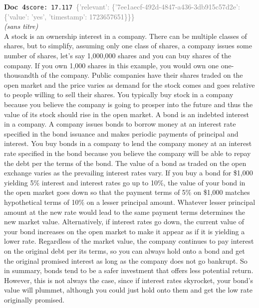\documentclass[a4paper,11pt]{article}
\begin{document}
\begin{docenv}
{\footnotesize\textcolor{doccolor}{\textbf{Doc~4}}}\hfill{\tiny\texttt{score:~17.117}}\ {\tiny\textcolor{gray}{\{'relevant': \{'7ee1aecf-492d-4847-a436-3db915c57d2e': \{'value': 'yes', 'timestamp': 1723657651\}\}\}}}\\[3pt]
{\small\textit{(sans titre)}}\\[2pt]
\vspace{2pt}
{\footnotesize 
A stock is an ownership interest in a company.  There can be multiple classes of shares, but to simplify, assuming only one class of shares, a company issues some number of shares, let's say 1,000,000 shares and you can buy shares of the company. If you own 1,000 shares in this example, you would own one one-thousandth of the company.  Public companies have their shares traded on the open market and the price varies as demand for the stock comes and goes relative to people willing to sell their shares. You typically buy stock in a company because you believe the company is going to prosper into the future and thus the value of its stock should rise in the open market. A bond is an indebted interest in a company.  A company issues bonds to borrow money at an interest rate specified in the bond issuance and makes periodic payments of principal and interest.  You buy bonds in a company to lend the company money at an interest rate specified in the bond because you believe the company will be able to repay the debt per the terms of the bond.  The value of a bond as traded on the open exchange varies as the prevailing interest rates vary.  If you buy a bond for \$1,000 yielding 5\% interest and interest rates go up to 10\%, the value of your bond in the open market goes down so that the payment terms of 5\% on \$1,000 matches hypothetical terms of 10\% on a lesser principal amount.  Whatever lesser principal amount at the new rate would lead to the same payment terms determines the new market value.   Alternatively, if interest rates go down, the current value of your bond increases on the open market to make it appear as if it is yielding a lower rate. Regardless of the market value, the company continues to pay interest on the original debt per its terms, so you can always hold onto a bond and get the original promised interest as long as the company does not go bankrupt. So in summary, bonds tend to be a safer investment that offers less potential return.  However, this is not always the case, since if interest rates skyrocket, your bond's value will plummet, although you could just hold onto them and get the low rate originally promised.}
\end{docenv}
\end{document}
